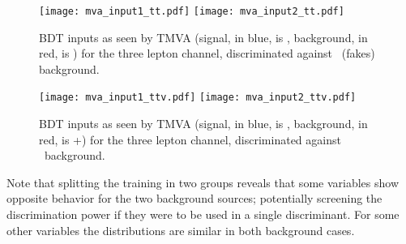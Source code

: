 \begin{figure} [!h]
  \centering
  \texttt{[image: mva\_input1\_tt.pdf]}
  \texttt{[image: mva\_input2\_tt.pdf]}
\caption[BDT inputs as seen by TMVA against \ttbar.]{BDT inputs as seen by TMVA (signal, in blue, is \tHq, background, in red, is \ttbar) for the three lepton channel, discriminated against \ttbar\ (fakes) background.} 
\label{mva_input_tt}
\end{figure}

\begin{figure} [!h]
  \centering
  \texttt{[image: mva\_input1\_ttv.pdf]}
  \texttt{[image: mva\_input2\_ttv.pdf]}
\caption[BDT inputs as seen by TMVA against \ttV\ .]{BDT inputs as seen by TMVA (signal, in blue, is \tHq, background, in red, is \ttW+\ttZ) for the three lepton channel, discriminated against \ttV\ background.}                                                                                                                                                         
\label{mva_input_ttv}
\end{figure}



Note that splitting the training in two groups reveals that some variables show opposite behavior for the two background sources; potentially screening the discrimination power if they were to be used in a single discriminant. For some other variables the distributions are similar in both background cases.

